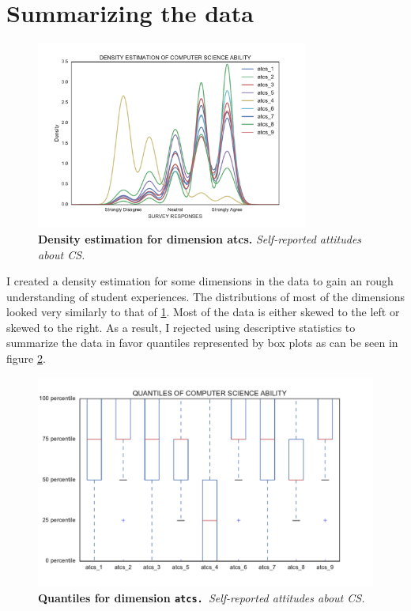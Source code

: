 \section*{Summarizing the data}
\begin{figure}[!hbtp]
\centering
    \caption{\textbf{Density estimation for dimension atcs. }\textit{Self-reported attitudes about CS.}}\label{atcs}
    \includegraphics[width=0.8\textwidth]{figures/atcs}
\end{figure}
I created a density estimation for some dimensions in the data to gain an rough understanding of student experiences. The distributions of most of the dimensions looked very similarly to that of \ref{atcs}. Most of the data is either skewed to the left or skewed to the right. As a result, I rejected using descriptive statistics to summarize the data in favor quantiles represented by box plots as can be seen in figure \ref{atcs_dimension}. 
\begin{figure}[!hbtp]
\centering
    \caption{\textbf{Quantiles for dimension \texttt{atcs. }}\textit{Self-reported attitudes about CS.}}\label{atcs_dimension}
    \includegraphics[width=1\textwidth]{figures/atcs_quantile}
\end{figure}

